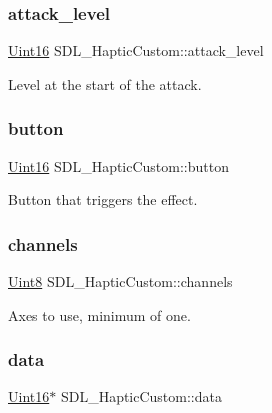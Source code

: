 \subsubsection{\texorpdfstring{attack\+\_\+level}{attack\_level}}
{\footnotesize\ttfamily \mbox{\hyperlink{_s_d_l__stdinc_8h_a31fcc0a076c9068668173ee26d33e42b}{Uint16}} S\+D\+L\+\_\+\+Haptic\+Custom\+::attack\+\_\+level}

Level at the start of the attack. \mbox{\label{struct_s_d_l___haptic_custom_aa4fbaf7220f3197aa6631b3e64ad6562}} 
\subsubsection{\texorpdfstring{button}{button}}
{\footnotesize\ttfamily \mbox{\hyperlink{_s_d_l__stdinc_8h_a31fcc0a076c9068668173ee26d33e42b}{Uint16}} S\+D\+L\+\_\+\+Haptic\+Custom\+::button}

Button that triggers the effect. \mbox{\label{struct_s_d_l___haptic_custom_a560215762e9096d583d75867d9227cf5}} 
\subsubsection{\texorpdfstring{channels}{channels}}
{\footnotesize\ttfamily \mbox{\hyperlink{_s_d_l__stdinc_8h_a2944638813a090aa23e62f4da842c3e2}{Uint8}} S\+D\+L\+\_\+\+Haptic\+Custom\+::channels}

Axes to use, minimum of one. \mbox{\label{struct_s_d_l___haptic_custom_ad5a034f97e1699eacbe3f478538537c5}} 
\subsubsection{\texorpdfstring{data}{data}}
{\footnotesize\ttfamily \mbox{\hyperlink{_s_d_l__stdinc_8h_a31fcc0a076c9068668173ee26d33e42b}{Uint16}}$\ast$ S\+D\+L\+\_\+\+Haptic\+Custom\+::data}

